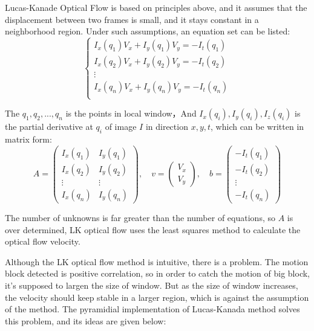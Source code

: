 Lucas-Kanade Optical Flow is based on principles above, and it assumes that the displacement between
two frames is small, and it stays constant in a neighborhood region. Under such assumptions, an equation
set can be listed: \\
\begin{equation}
	\left\{
		\begin{array}{c}
			I_x(q_1)V_x + I_y(q_1)V_y = -I_t(q_1)\\
			I_x(q_2)V_x + I_y(q_2)V_y = -I_t(q_2)\\
			\vdots\\
			I_x(q_n)V_x + I_y(q_n)V_y = -I_t(q_n)\\
		\end{array}
	\right.
\end{equation}

The $q_1,q_2,...,q_n$ is the points in local window，And $I_x(q_i),I_y(q_i),I_z(q_i)$ is the partial derivative
at $q_i$ of image $I$ in direction $x,y,t$, which can be written in matrix form:
\begin{equation}
	A=	
	\left(
	\begin{array}{cc}
		I_x(q_1) & I_y(q_1)\\
		I_x(q_2) & I_y(q_2)\\
		  \vdots & \vdots\\
		I_x(q_n) & I_y(q_n)
		\end{array}
	\right),\quad
	v=
	\left(
	\begin{array}{c}
		V_x\\
		V_y
	\end{array}
	\right),\quad
	b=
	\left(
	\begin{array}{c}
		-I_t(q_1)\\
		-I_t(q_2)\\
		\vdots\\
		-I_t(q_n)
	\end{array}
	\right)
\end{equation}

The number of unknowns is far greater than the number of equations, so $A$ is over determined, LK optical flow
uses the least squares method to calculate the optical flow velocity. 

Although the LK optical flow method is intuitive, there is a problem. The motion block detected is positive correlation,
so in order to catch the motion of big block, it's supposed to largen the size of window. But as the size of window increases,
the velocity should keep stable in a larger region, which is against the assumption of the method. The pyramidial implementation
of Lucas-Kanada method solves this problem, and its ideas are given below:\\

